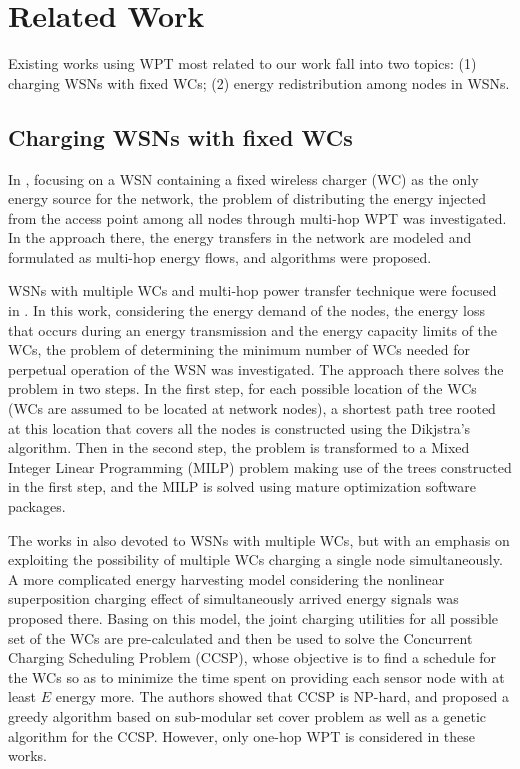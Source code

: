 \documentclass[journal,10pt]{IEEEtran}
\begin{document}
\section{Related Work}
\label{sec_relwork}
Existing works using WPT most related to our work fall into two topics: (1) charging WSNs with fixed WCs; (2) energy redistribution among nodes in WSNs.

\subsection{Charging WSNs with fixed WCs}

In \cite{Xiang2013}, focusing on a WSN containing a fixed wireless charger (WC) as the only energy source for the network, the problem of distributing the energy injected from the access point among all nodes through multi-hop WPT was investigated. In the approach there, the energy transfers in the network are modeled and formulated as multi-hop energy flows, and algorithms were proposed.

WSNs with multiple WCs and multi-hop power transfer technique were focused in \cite{Rault2013}. In this work, considering the energy demand of the nodes, the energy loss that occurs during an energy transmission and the energy capacity limits of the WCs, the problem of determining the minimum number of WCs needed for perpetual operation of the WSN was investigated. The approach there solves the problem in two steps. In the first step, for each possible location of the WCs (WCs are assumed to be located at network nodes), a shortest path tree rooted at this location that covers all the nodes is constructed using the Dikjstra's algorithm. Then in the second step, the problem is transformed to a Mixed Integer Linear Programming (MILP) problem making use of the trees constructed in the first step, and the MILP is solved using mature optimization software packages.

The works in \cite{Guo2017,Guo2016} also devoted to WSNs with multiple WCs, but with an emphasis on exploiting the possibility of multiple WCs charging a single node simultaneously. A more complicated energy harvesting model considering the nonlinear superposition charging effect of simultaneously arrived energy signals was proposed there. Basing on this model, the joint charging utilities for all possible set of the WCs are pre-calculated and then be used to solve the Concurrent Charging Scheduling Problem (CCSP), whose objective is to find a schedule for the WCs so as to minimize the time spent on providing each sensor node with at least $E$ energy more. The authors showed that CCSP is NP-hard, and proposed a greedy algorithm based on sub-modular set cover problem as well as a genetic algorithm for the CCSP. However, only one-hop WPT is considered in these works.
\end{document}
